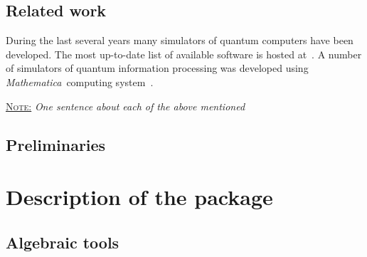 \documentclass[11pt,a4paper]{article}
\newcommand{\Mathematica}{\emph{Mathematica}}
\newcommand{\1}{{\bf 1}}
\newcommand{\note}[1]{\vspace{6pt}\noindent\underline{\textsc{Note:}} \textit{{#1}}\vspace{6pt}}
\begin{document}
\subsection{Related work}

During the last several years many simulators of quantum computers have been
developed. The most up-to-date list of available software is hosted
at~\cite{quantiki-simulators}. A number of simulators of quantum
information processing was developed using \Mathematica\ computing
system~\cite{qucalc, qdensity, quantum2, miszczak12generating, qcwave}. 

\note{One sentence about each of the above mentioned}





\subsection{Preliminaries}

\section{Description of the package}

\subsection{Algebraic tools}

\end{document}
